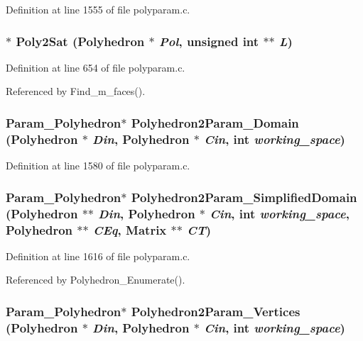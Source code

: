 Definition at line 1555 of file polyparam.c.
\subsubsection{$\ast$ Poly2Sat (Polyhedron $\ast$ {\em Pol}, unsigned int $\ast$$\ast$ {\em L})\hspace{0.3cm}{\tt  [static]}}\label{polyparam_8c_a29}




Definition at line 654 of file polyparam.c.

Referenced by Find\_\-m\_\-faces().

\subsubsection{\setlength{\rightskip}{0pt plus 5cm}Param\_\-Polyhedron$\ast$ Polyhedron2Param\_\-Domain (Polyhedron $\ast$ {\em Din}, Polyhedron $\ast$ {\em Cin}, int {\em working\_\-space})}\label{polyparam_8c_a41}




Definition at line 1580 of file polyparam.c.
\subsubsection{\setlength{\rightskip}{0pt plus 5cm}Param\_\-Polyhedron$\ast$ Polyhedron2Param\_\-Simplified\-Domain (Polyhedron $\ast$$\ast$ {\em Din}, Polyhedron $\ast$ {\em Cin}, int {\em working\_\-space}, Polyhedron $\ast$$\ast$ {\em CEq}, Matrix $\ast$$\ast$ {\em CT})}\label{polyparam_8c_a42}




Definition at line 1616 of file polyparam.c.

Referenced by Polyhedron\_\-Enumerate().

\subsubsection{\setlength{\rightskip}{0pt plus 5cm}Param\_\-Polyhedron$\ast$ Polyhedron2Param\_\-Vertices (Polyhedron $\ast$ {\em Din}, Polyhedron $\ast$ {\em Cin}, int {\em working\_\-space})}\label{polyparam_8c_a35}




